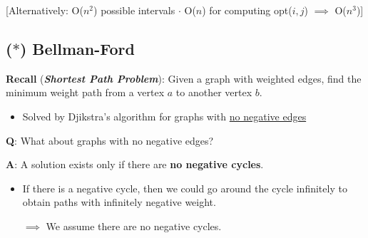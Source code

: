 \documentclass[12pt]{extarticle}
\theoremstyle{definition}
\theoremstyle{remark}
\begin{document}
\vspace{5pt}
[Alternatively: O($n^2$) possible intervals $\cdot$ O($n$) for computing opt($i,j$) $\implies$ O($n^3$)]

\pagebreak
\subsection{($\ast$) Bellman-Ford}
\textbf{Recall} (\textbf{\textit{Shortest Path Problem}}): Given a graph with weighted edges, find the minimum weight path from a vertex $a$ to another vertex $b$. \begin{itemize}
    \item Solved by Djikstra's algorithm for graphs with \ul{no negative edges}
\end{itemize}

\vspace{10pt}
\noindent\textbf{Q}: What about graphs with no negative edges?

\vspace{5pt}
\noindent\textbf{A}: A solution exists only if there are \textbf{no negative cycles}.\begin{itemize}
    \item If there is a negative cycle, then we could go around the cycle infinitely to obtain paths with infinitely negative weight.
    
    $\implies$ We assume there are no negative cycles.
\end{itemize}
\end{document}

